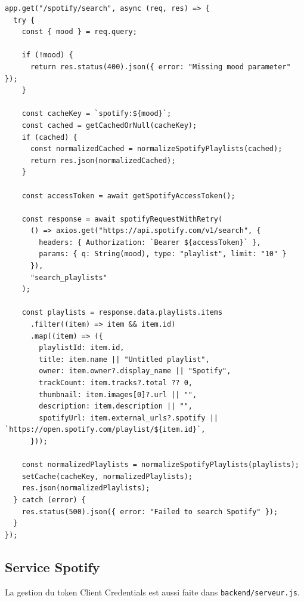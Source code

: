 \documentclass[a4paper,11pt]{article}
\begin{document}
\begin{lstlisting}
app.get("/spotify/search", async (req, res) => {
  try {
    const { mood } = req.query;

    if (!mood) {
      return res.status(400).json({ error: "Missing mood parameter" });
    }

    const cacheKey = `spotify:${mood}`;
    const cached = getCachedOrNull(cacheKey);
    if (cached) {
      const normalizedCached = normalizeSpotifyPlaylists(cached);
      return res.json(normalizedCached);
    }

    const accessToken = await getSpotifyAccessToken();

    const response = await spotifyRequestWithRetry(
      () => axios.get("https://api.spotify.com/v1/search", {
        headers: { Authorization: `Bearer ${accessToken}` },
        params: { q: String(mood), type: "playlist", limit: "10" }
      }),
      "search_playlists"
    );

    const playlists = response.data.playlists.items
      .filter((item) => item && item.id)
      .map((item) => ({
        playlistId: item.id,
        title: item.name || "Untitled playlist",
        owner: item.owner?.display_name || "Spotify",
        trackCount: item.tracks?.total ?? 0,
        thumbnail: item.images[0]?.url || "",
        description: item.description || "",
        spotifyUrl: item.external_urls?.spotify || `https://open.spotify.com/playlist/${item.id}`,
      }));

    const normalizedPlaylists = normalizeSpotifyPlaylists(playlists);
    setCache(cacheKey, normalizedPlaylists);
    res.json(normalizedPlaylists);
  } catch (error) {
    res.status(500).json({ error: "Failed to search Spotify" });
  }
});
\end{lstlisting}

\subsection{Service Spotify}

La gestion du token Client Credentials est aussi faite dans \texttt{backend/serveur.js}.
\end{document}
